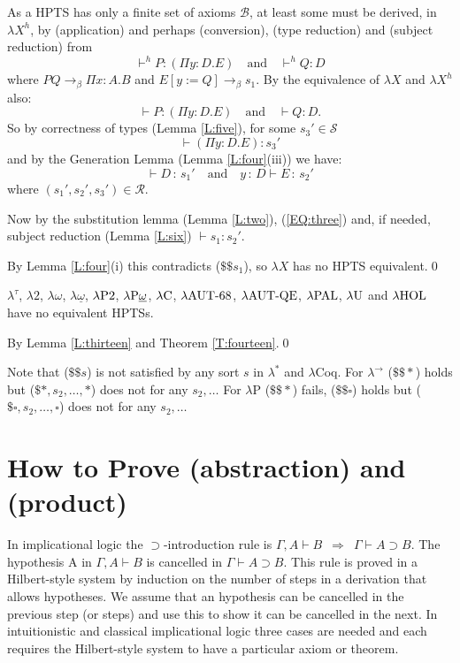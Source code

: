 \documentclass{LMCS}
\def\rbox#1{\mbox{\rm #1}}
\def\:{\mathbin{\,:\,}}
\def\RIghtarrow{\enspace\Rightarrow\enspace}
\begin{document}
  As a HPTS has only a finite set of axioms $\mathcal B$, at least
  some must be derived, in $\lambda X^h$, by (application) and perhaps
  (conversion), (type reduction) and (subject reduction) from
\[\vdash^h P:(\Pi y{:}D.E)\quad\mbox{and}\quad\vdash^hQ:D\]
  where $PQ\rightarrow_{\beta}\Pi x{:}A.B$ and $E[y:=Q]
 \rightarrow_{\beta} s_1$.
  By the equivalence of $\lambda X$ and $\lambda X^h$ also:
\begin{equation}\label{EQ:three}
 \vdash P:(\Pi y{:}D.E)\quad\mbox{and}\quad\vdash Q:D.
\end{equation}
  So by correctness of types (Lemma \ref{L:five}), for some $s_3'\in
  {\mathcal S}$
\[\vdash(\Pi y{:}D.E):s_3'\]
  and by the Generation Lemma (Lemma \ref{L:four}(iii)) we have:
\[\vdash D\:s_1'\quad\mbox{and}\quad y\:D\vdash E\:s_2'\]
  where $(s_1',s_2',s_3')\in {\mathcal R}$.

  Now by the substitution lemma (Lemma \ref{L:two}), (\ref{EQ:three})
  and, if needed, subject reduction (Lemma \ref{L:six}) $\vdash
  s_1:s_2'$.

  By Lemma \ref{L:four}(i) this contradicts ($\$\$s_1$), so $\lambda X$ has no
  HPTS equivalent.\qed

\begin{thm}\label{T:fifteen}
  $\lambda^\tau$, $\lambda2$, $\lambda{\omega}$,
  $\lambda\underline{\omega}$, $\lambda\rbox{P2}$,
  $\lambda\rbox{P}\underline{\omega}$, $\lambda\rbox{C}$,
  $\lambda\rbox{AUT-68}$, $\lambda\rbox{AUT-QE}$, $\lambda\rbox{PAL}$,
  $\lambda\rbox{U}$ and $\lambda\rbox{HOL}$ have no equivalent HPTSs.
\end{thm}

\proof By Lemma \ref{L:thirteen} and Theorem \ref{T:fourteen}.\qed

  Note that ($\$\$s$) is not satisfied by any sort $s$ in
  $\lambda^{\ast}$ and $\lambda $Coq.  For $\lambda^{\rightarrow}$
  ($\$\$\ast$) holds but ($\$\ast,s_2,\dots ,\ast$) does not for any
  $s_2,\dots $ For $\lambda $P ($\$\$\ast$) fails, ($\$\$\square$) holds
  but ($\$\square,s_2,\dots ,\square$) does not for any $s_2,\dots $
\vfill\eject

\section{How to Prove (abstraction) and (product)}\label{S:AbsProd}

 \noindent In implicational logic the $\supset$-introduction rule is
  $\Gamma, A\vdash B\RIghtarrow\Gamma\vdash A\supset B$. The
  hypothesis A in $\Gamma, A\vdash B$ is cancelled in $\Gamma\vdash
  A\supset B$. This rule is proved in a Hilbert-style system by
  induction on the number of steps in a derivation that allows
  hypotheses. We assume that an hypothesis can be cancelled in the
  previous step (or steps) and use this to show it can be cancelled in
  the next.  In intuitionistic and classical implicational logic three
  cases are needed and each requires the Hilbert-style system to have
  a particular axiom or theorem.
\end{document}
